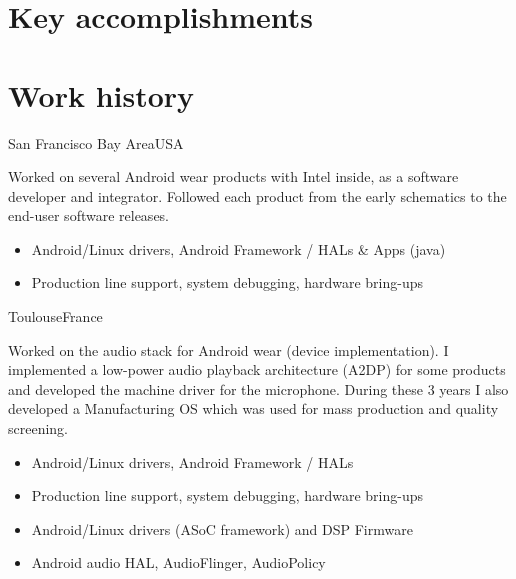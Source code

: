 \documentclass[a4paper,11pt,sans]{moderncv}
\begin{document}
\section{Key accomplishments}
\begin{cvcolumns}
\end{cvcolumns}
\begin{cvcolumns}
\end{cvcolumns}


\section{Work history}
{San Francisco Bay Area}{USA}
{
  Worked on several Android wear products with Intel inside, as a software developer and integrator.
  Followed each product from the early schematics to the end-user software releases.
    \begin{itemize}
        \item Android/Linux drivers, Android Framework / HALs \& Apps (java)
        \item Production line support, system debugging, hardware bring-ups
    \end{itemize}
}

{Toulouse}{France}
{
  Worked on the audio stack for Android wear (device implementation). I implemented a low-power audio playback architecture (A2DP) for some products and developed the machine driver for the microphone.
  During these 3 years I also developed a Manufacturing OS which was used for mass production and quality screening.
    \begin{itemize}
        \item Android/Linux drivers, Android Framework / HALs
        \item Production line support, system debugging, hardware bring-ups
        \item Android/Linux drivers (ASoC framework) and DSP Firmware
        \item Android audio HAL, AudioFlinger, AudioPolicy
    \end{itemize}
}
\end{document}
